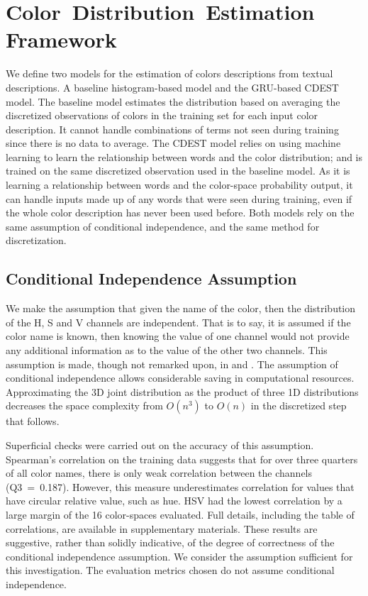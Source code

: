 \documentclass[11pt,a4paper]{article}
\newcommand{\textcite}{\citet}
\begin{document}
\section{Color~Distribution~Estimation Framework}\label{sec:method}
We define two models for the estimation of colors descriptions from textual descriptions.
A baseline histogram-based model and the GRU-based CDEST model.
The baseline model estimates the distribution based on averaging the discretized observations of colors in the training set for each input color description.
It cannot handle combinations of terms not seen during training since there is no data to average.
The CDEST model relies on using machine learning to learn the relationship between words and the color distribution; and is trained on the same discretized observation used in the baseline model.
As it is learning a relationship between words and the color-space probability output, it can handle inputs made up of any words that were seen during training, even if the whole color description has never been used before.
Both models rely on the same assumption of conditional independence, and the same method for discretization.


\subsection{Conditional Independence Assumption}\label{sec:conditional-independence-assumption}
We make the assumption that given the name of the color, then the distribution of the H, S and V channels are independent.
That is to say, it is assumed if the color name is known, then  knowing the value of one channel would not provide any additional information as to the value of the other two channels.
This assumption is made, though not remarked upon, in \textcite{meomcmahanstone:color} and \textcite{mcmahan2015bayesian}.
The assumption of conditional independence allows considerable saving in computational resources.
Approximating the 3D joint distribution as the product of three 1D distributions decreases the space complexity from $O(n^3)$ to $O(n)$ in the discretized step that follows.

Superficial checks were carried out on the accuracy of this assumption.
Spearman's correlation on the training data suggests that for over three quarters of all color names, there is only weak correlation between the channels (\mbox{Q3 = 0.187}).
However, this measure underestimates correlation for values that have circular relative value, such as hue.
HSV had the lowest correlation by a large margin of the 16 color-spaces evaluated.
Full details, including the table of correlations, are available in supplementary materials.
These results are suggestive, rather than solidly indicative, of the degree of correctness of the conditional independence assumption.
We consider the assumption sufficient for this investigation.
The evaluation metrics chosen do not assume conditional independence.
\end{document}
